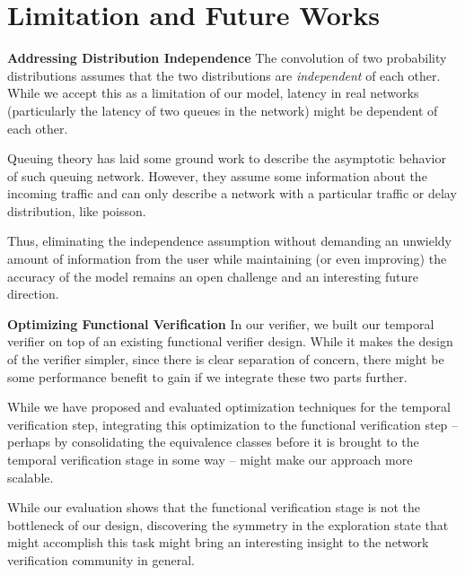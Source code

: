 \section{Limitation and Future Works} \label{sec:fut}
\textbf{Addressing Distribution Independence}
The convolution of two probability distributions assumes that the two distributions are \textit{independent}
of each other.
While we accept this as a limitation of our model, latency in real networks (particularly the latency of two 
queues in the network) might be dependent of each other.

Queuing theory has laid some ground work to describe the asymptotic behavior of such queuing network.
However, they assume some information about the incoming traffic and can only describe a network with a 
particular traffic or delay distribution, like poisson.

Thus, eliminating the independence assumption without demanding an unwieldy amount of information from 
the user while maintaining (or even improving) the accuracy of the model remains an open challenge and an 
interesting future direction.

\textbf{Optimizing Functional Verification}
In our verifier, we built our temporal verifier on top of an existing functional verifier design.
While it makes the design of the verifier simpler, since there is clear separation of concern, there 
might be some performance benefit to gain if we integrate these two parts further.

While we have proposed and evaluated optimization techniques for the temporal verification step, 
integrating this optimization to the functional verification step -- perhaps by consolidating the 
equivalence classes before it is brought to the temporal verification stage in some way -- might make 
our approach more scalable.

While our evaluation shows that the functional verification stage is not the bottleneck of our design, 
discovering the symmetry in the exploration state that might accomplish this task might bring an interesting 
insight to the network verification community in general.